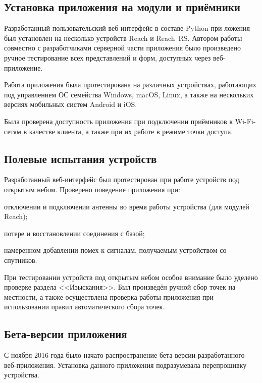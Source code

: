 
\subsection{Установка приложения на модули и приёмники}

Разработанный пользовательский веб-интерфейс в составе Python-при-ложения был установлен на несколько устройств Reach и Reach~RS. Автором работы совместно с разработчиками серверной части приложения было произведено ручное тестирование всех представлений и форм, доступных через веб-приложение.

Работа приложения была протестирована на различных устройствах, работающих под управлением ОС семейства Windows, macOS, Linux, а также на нескольких версиях мобильных систем Android и iOS.

Была проверена доступность приложения при подключении приёмников к Wi-Fi-сетям в качестве клиента, а также при их работе в режиме точки доступа.



\subsection{Полевые испытания устройств}

Разработанный веб-интерфейс был протестирован при работе устройств под открытым небом. Проверено поведение приложения при:
\begin{dashitemize}
  \item отключении и подключении антенны во время работы устройства (для модулей Reach);
  \item потере и восстановлении соединения с базой;
  \item намеренном добавлении помех к сигналам, получаемым устройством со спутников.
\end{dashitemize}

При тестировании устройств под открытым небом особое внимание было уделено проверке раздела <<Изыскания>>. Был произведён ручной сбор точек на местности, а также осуществлена проверка работы приложения при использовании правил автоматического сбора точек.



\subsection{Бета-версии приложения}

С ноября 2016 года было начато распространение бета-версии разработанного веб-приложения. Установка данного приложения подразумевала перепрошивку устройства.


